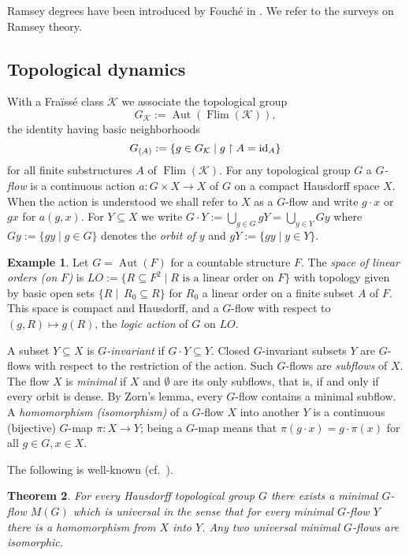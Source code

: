 \documentclass[12pt]{amsart}
\theoremstyle{plain}
\newtheorem{theorem}{Theorem}[section]
\theoremstyle{definition}
\newtheorem{example}[theorem]{Example}
\begin{document}
Ramsey degrees have been introduced by Fouch\'e in \cite{fouche}. We refer to 
the surveys \cite{grs, nesetrilsurvey} on Ramsey theory.

\subsection{Topological dynamics} With a Fra\"iss\'e class ${\mathcal K}$ we associate the topological group
$$
G_{\mathcal K}:=\operatorname{Aut}(\operatorname{Flim}({\mathcal K})),
$$
the identity having basic neighborhoods
$$
G_{(A)}:=\{g\in G_{\mathcal K}\mid g\upharpoonright A=\textup{id}_A\}
$$
for all finite substructures $A$ of $\operatorname{Flim}({\mathcal K})$. For any topological group $G$ a {\em $G$-flow} is a continuous action 
$a:G\times X\to X$ of $G$ on a compact Hausdorff space $X$. 
When the action is understood we shall refer to $X$ as a $G$-flow 
and write $g\cdot x$ or $gx$ for $a(g,x)$. For $Y\subseteq X$ we
write $G\cdot Y:=\bigcup_{g\in G}gY=\bigcup_{y\in Y}Gy$ where $Gy:=\{gy\mid g\in G\}$ denotes the {\em orbit of $y$} and 
$gY:=\{gy\mid y\in Y\}$.

\begin{example}\label{exa:lo} Let $G=\operatorname{Aut}(F)$ for a countable structure $F$. 
The {\em space of linear orders (on $F$)} is 
$\textit{LO}:=\{R\subseteq F^2\mid R \textrm{ is a linear order on } F\}$ with topology given by basic open sets
$\{R\mid \ R_0 \subseteq R\}$ for $R_0$ a linear order on a finite 
subset $A$ of $F$. This space is compact and Hausdorff, and a $G$-flow with 
respect to $(g,R)\mapsto g(R)$, the {\em logic action} of $G$ on $\textit{LO}$.
\end{example}

A subset $Y\subseteq X$ is {\em $G$-invariant} if $G\cdot Y\subseteq Y$. 
Closed $G$-invariant subsets $Y$ are $G$-flows with respect to the restriction 
of the action. Such $G$-flows are {\em subflows} of $X$. 
The flow $X$ is {\em minimal} if $X$ and $\emptyset$ are its only subflows, 
that is, if and only if every orbit is dense. By Zorn's lemma, every $G$-flow contains a minimal subflow.
A {\em homomorphism (isomorphism)} of a $G$-flow $X$ into another $Y$ is a continuous (bijective) 
$G$-map $\pi:X\to Y$; being a $G$-map means that $\pi(g\cdot x)=g\cdot \pi(x)$ for all $g\in G,x\in X$.

The following is well-known (cf.~\cite[$\S 3$]{usp}). 

\begin{theorem} For every  Hausdorff  topological group $G$ there exists a minimal $G$-flow $M(G)$ which is {\em universal} in the sense that for every minimal $G$-flow $Y$ there is a homomorphism from $X$ into $Y$. Any two universal minimal $G$-flows are isomorphic. 
\end{theorem}
\end{document}
